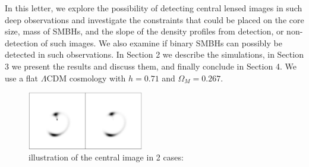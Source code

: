 \documentclass[chicago]{emulateapj}
\begin{document}
 In this letter, we explore the possibility of detecting central lensed images in such deep observations and investigate the constraints that could be placed on the core size, mass of SMBHs, and the slope of the density profiles from detection, or non-detection of such images. We also examine if binary SMBHs can possibly be detected in such observations. 
 In Section 2 we describe the simulations, in Section 3 we present the results and discuss them, and finally conclude in Section 4. We use a flat $\Lambda$CDM cosmology with $h=0.71$ and $\Omega_M=0.267$.
 


\begin{figure}
\begin{center}
\centering
\includegraphics[trim= 0 0 0 0, width=0.45\textwidth]{figures/f_02.eps}
\centering
\end{center}
\caption{ illustration of the central image in 2 cases: 
\label{fig1}}
\end{figure}
\end{document}
